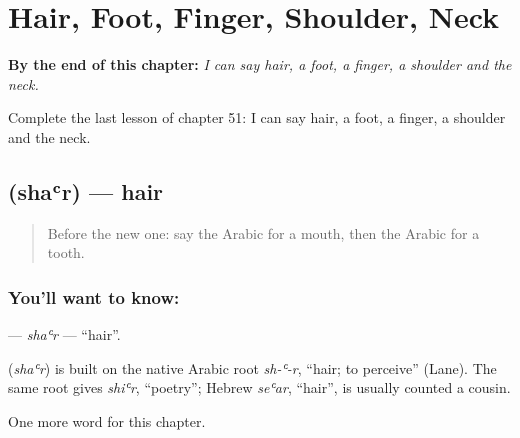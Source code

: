 
\chapter{Hair, Foot, Finger, Shoulder, Neck}
\label{ch:ar-hair-foot-finger-shoulder-neck}

\begin{chapteropening}
\textbf{By the end of this chapter:} \emph{I can say hair, a foot, a finger, a shoulder and the neck.}

Complete the last lesson of chapter 51: I can say hair, a foot, a finger, a shoulder and the neck.
\end{chapteropening}

\section[\texorpdfstring{\ar{شعر} (shaʿr)}{شعر (shaʿr)}]{ (shaʿr) — hair}

\label{lesson:AR-C51-shar}



\begin{quote}
Before the new one: say the Arabic for a mouth, then the Arabic for a tooth.
\end{quote}

\subsection*{You'll want to know: }
\textbf{} — \emph{shaʿr} — \textquotedblleft{}hair\textquotedblright{}.

\begin{cousinweb}
\textbf{} (\emph{shaʿr}) is built on the native Arabic root \emph{sh-ʿ-r}, \textquotedblleft{}hair; to perceive\textquotedblright{} (Lane). The same root gives \emph{shiʿr}, \textquotedblleft{}poetry\textquotedblright{}; Hebrew \emph{seʿar}, \textquotedblleft{}hair\textquotedblright{}, is usually counted a cousin.
\end{cousinweb}

\begin{grammarlens}[title={What you've built}]
One more word for this chapter.
\end{grammarlens}

